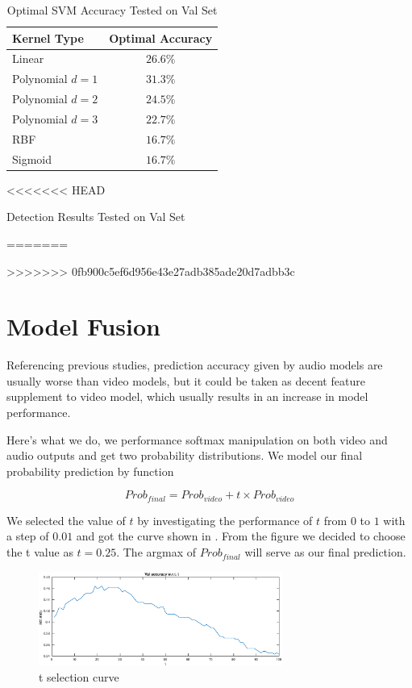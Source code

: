 \documentclass[10pt,twocolumn,letterpaper]{article}
\begin{document}
\begin{table}[htpb]
   \begin{center}
      \begin{tabular}{|l|c|}
         \hline
         Kernel Type & Optimal Accuracy\\
         \hline\hline
         Linear & $26.6\%$\\
         \hline
         Polynomial $d=1$ & $31.3\%$ \\
         \hline
         Polynomial $d=2$ & $24.5\%$ \\
         \hline
         Polynomial $d=3$ & $22.7\%$ \\
         \hline
         RBF & $16.7\%$ \\
         \hline
         Sigmoid & $16.7\%$ \\
         \hline
      \end{tabular}
   \end{center}
<<<<<<< HEAD
   \caption{Detection Results Tested on Val Set}
   
=======
   \caption{Optimal SVM Accuracy Tested on Val Set}
   \label{tableSVM}
>>>>>>> 0fb900c5ef6d956e43e27adb385ade20d7adbb3c
\end{table}

\section{Model Fusion}

Referencing previous studies, prediction accuracy given by audio models are usually worse than video models, but it could be taken as decent feature supplement to video model, which usually results in an increase in model performance.

Here's what we do, we performance softmax manipulation on both video and audio outputs and get two probability distributions. We model our final probability prediction by function

\begin{equation}
Prob_{final} = Prob_{video} + t \times Prob_{video} 
\end{equation}

We selected the value of $t$ by investigating the performance of $t$ from $0$ to $1$ with a step of $0.01$ and got the curve shown in . From the figure we decided to choose the t value as $t=0.25$. The argmax of $Prob_{final}$ will serve as our final prediction.

\begin{figure}[t]
	\centering
	\includegraphics[width = 8cm]{pic/t_selection.eps}
	\caption{t selection curve}
\end{figure}
\end{document}
